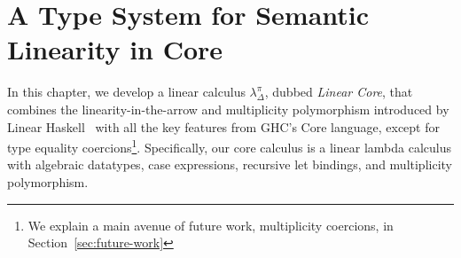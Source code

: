 \documentclass[acmsmall, screen, review]{acmart}
\begin{document}
  

\section{A Type System for Semantic Linearity in Core\label{sec:main:linear-core}}

In this chapter, we develop a linear calculus $\lambda_\Delta^\pi$, dubbed \emph{Linear Core}, that 
combines the linearity-in-the-arrow and multiplicity polymorphism introduced by
Linear Haskell~\cite{cite:linearhaskell} with all the key features from GHC's Core
language, except for type equality coercions\footnote{We explain a main avenue of
future work, multiplicity coercions, in Section~\ref{sec:future-work}}.
%
Specifically, our core calculus is a linear lambda calculus with algebraic
datatypes, case expressions, recursive let bindings, and multiplicity
polymorphism.
\end{document}
